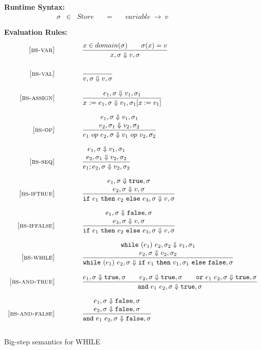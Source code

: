 \documentclass{article}
\begin{document}
\begin{figure}[H]\label{fig:bigstep}
\caption{Big-step semantics for WHILE}
{\bf Runtime Syntax:}
\[
\begin{array}{rclcl}
  \sigma & \in & {Store} \quad  & = & \quad {variable} ~\rightarrow ~v \\
  \\
\end{array}
\]
{\bf Evaluation Rules:~~~ } \\
\[
\begin{array}{r@{\qquad\qquad}l}

\bsrule{bs-var}{
  x \in domain(\sigma) \qquad \sigma(x)=v
}{
  \bstep{x}{\sigma}{v}{\sigma}
}

\bsrule{bs-val}{
}{
  \bstep{v}{\sigma}{v}{\sigma}
}

\bsrule{bs-assign}{
  \bstep{e_1}{\sigma}{v_1}{\sigma_1}
}{
  \bstep{\assign{x}{e_1}}{\sigma}{v_1}{\sigma_1[x:=v_1]}
}

\bsrule{bs-op}{
  \bstep{e_1}{\sigma}{v_1}{\sigma_1} \\
  \bstep{e_2}{\sigma_1}{v_2}{\sigma_2}
}{
  \bstep{e_1~op~e_2}{\sigma}{v_1 ~op~ v_2}{\sigma_2}
}

\bsrule{bs-seq}{
  \bstep{e_1}{\sigma}{v_1}{\sigma_1} \\
  \bstep{e_2}{\sigma_1}{v_2}{\sigma_2}
}{
  \bstep{e_1;e_2}{\sigma}{v_2}{\sigma_2}
}

\bsrule{bs-iftrue}{
  \bstep{e_1}{\sigma}{\true}{\sigma} \\
  \bstep{e_2}{\sigma}{v}{\sigma}
}{
  \bstep{\ife{e_1}{e_2}{e_3}}{\sigma}{v}{\sigma}
}

\bsrule{bs-iffalse}{
  \bstep{e_1}{\sigma}{\false}{\sigma} \\
  \bstep{e_3}{\sigma}{v}{\sigma}
}{
  \bstep{\ife{e_1}{e_2}{e_3}}{\sigma}{v}{\sigma}
}

\bsrule{bs-while}{
  \bstep{\whilee{e_1}{e_2}}{\sigma_2}{v_1}{\sigma_1} \\
  \bstep{e_2}{\sigma}{v_2}{\sigma_2}
}{
  \bstep{\whilee{e_1}{e_2}}{\sigma}{\ife{e_1}{{v_1},{\sigma_1}}{\false}}{\sigma}
}

\bsrule{bs-and-true}{
  \bstep{e_1}{\sigma}{\true}{\sigma} \qquad
  \bstep{e_2}{\sigma}{\true}{\sigma} \qquad
  \bstep{\orE{e_1}{e_2}}{\sigma}{\true}{\sigma}
}{
  \bstep{\andE{e_1}{e_2}}{\sigma}{\true}{\sigma}
}

\bsrule{bs-and-false}{
  \bstep{e_1}{\sigma}{\false}{\sigma} \\
  \bstep{e_2}{\sigma}{\false}{\sigma} \\
}{
  \bstep{\andE{e_1}{e_2}}{\sigma}{\false}{\sigma}
}


\end{array}\]
\end{figure}
\end{document}
